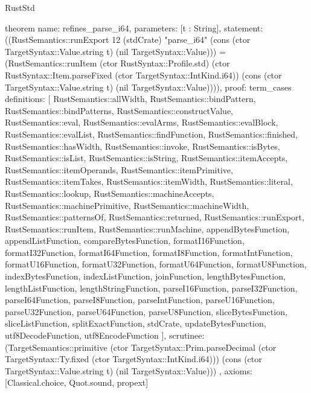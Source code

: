 \begin{lexlean}{RustStd}
\begin{semanticmodule}
theorem{
  name: refines_parse_i64,
  parameters: [t : String],
  statement: ((RustSemantics::runExport 12 (stdCrate) "parse_i64" (cons (ctor TargetSyntax::Value.string t) (nil TargetSyntax::Value))) = (RustSemantics::runItem (ctor RustSyntax::Profile.std) (ctor RustSyntax::Item.parseFixed (ctor TargetSyntax::IntKind.i64)) (cons (ctor TargetSyntax::Value.string t) (nil TargetSyntax::Value)))),
  proof: term_cases{
    definitions: [
      RustSemantics::allWidth,
      RustSemantics::bindPattern,
      RustSemantics::bindPatterns,
      RustSemantics::constructValue,
      RustSemantics::eval,
      RustSemantics::evalArms,
      RustSemantics::evalBlock,
      RustSemantics::evalList,
      RustSemantics::findFunction,
      RustSemantics::finished,
      RustSemantics::hasWidth,
      RustSemantics::invoke,
      RustSemantics::isBytes,
      RustSemantics::isList,
      RustSemantics::isString,
      RustSemantics::itemAccepts,
      RustSemantics::itemOperands,
      RustSemantics::itemPrimitive,
      RustSemantics::itemTakes,
      RustSemantics::itemWidth,
      RustSemantics::literal,
      RustSemantics::lookup,
      RustSemantics::machineAccepts,
      RustSemantics::machinePrimitive,
      RustSemantics::machineWidth,
      RustSemantics::patternsOf,
      RustSemantics::returned,
      RustSemantics::runExport,
      RustSemantics::runItem,
      RustSemantics::runMachine,
      appendBytesFunction,
      appendListFunction,
      compareBytesFunction,
      formatI16Function,
      formatI32Function,
      formatI64Function,
      formatI8Function,
      formatIntFunction,
      formatU16Function,
      formatU32Function,
      formatU64Function,
      formatU8Function,
      indexBytesFunction,
      indexListFunction,
      joinFunction,
      lengthBytesFunction,
      lengthListFunction,
      lengthStringFunction,
      parseI16Function,
      parseI32Function,
      parseI64Function,
      parseI8Function,
      parseIntFunction,
      parseU16Function,
      parseU32Function,
      parseU64Function,
      parseU8Function,
      sliceBytesFunction,
      sliceListFunction,
      splitExactFunction,
      stdCrate,
      updateBytesFunction,
      utf8DecodeFunction,
      utf8EncodeFunction
    ],
    scrutinee: (TargetSemantics::primitive (ctor TargetSyntax::Prim.parseDecimal (ctor TargetSyntax::Ty.fixed (ctor TargetSyntax::IntKind.i64))) (cons (ctor TargetSyntax::Value.string t) (nil TargetSyntax::Value)))
  },
  axioms: [Classical.choice, Quot.sound, propext]
}


\end{semanticmodule}
\end{lexlean}
